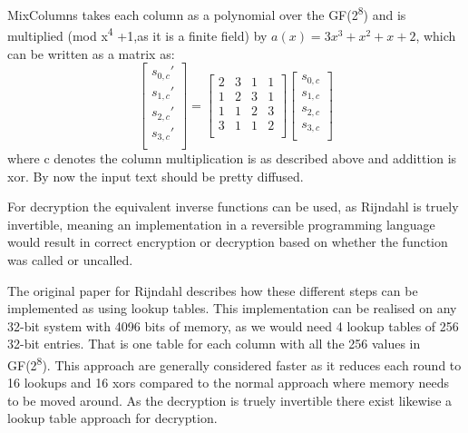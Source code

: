 \documentclass[a4paper]{article}
\begin{document}
MixColumns takes each column as a polynomial over the GF(2\textsuperscript{8}) and is multiplied (mod x\textsuperscript{4} +1,as it is a finite field) by \(a(x) = 3x^3 + x^2 + x + 2\), which can be written as a matrix as:
\[
\begin{bmatrix}
 s_{0,c}' \\
 s_{1,c}' \\
 s_{2,c}' \\
 s_{3,c}' \\
\end{bmatrix}=
\begin{bmatrix}
 2 & 3 & 1 & 1 \\
 1 & 2 & 3 & 1 \\
 1 & 1 & 2 & 3 \\
 3 & 1 & 1 & 2 \\
\end{bmatrix}
\begin{bmatrix}
 s_{0,c} \\
 s_{1,c} \\
 s_{2,c} \\
 s_{3,c} \\
\end{bmatrix}
\]
where c denotes the column multiplication is as described above and addittion is xor. By now the input text should be pretty diffused.

For decryption the equivalent inverse functions can be used, as Rijndahl is truely invertible, meaning an implementation in a reversible programming language would result in correct encryption or decryption based on whether the function was called or uncalled.

The original paper for Rijndahl\cite{Rijndahl} describes how these different steps can be implemented as using lookup tables. This implementation can be realised on any 32-bit system with 4096 bits of memory, as we would need 4 lookup tables of 256 32-bit entries. That is one table for each column with all the 256 values in GF(2\textsuperscript{8}). This approach are generally considered faster as it reduces each round to 16 lookups and 16 xors compared to the normal approach where memory needs to be moved around. As the decryption is truely invertible there exist likewise a lookup table approach for decryption.
\end{document}
